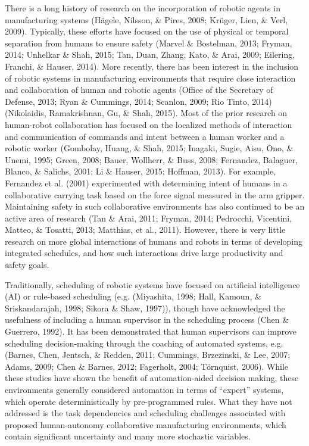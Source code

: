 There is a long history of research on the incorporation of robotic agents in manufacturing systems (Hägele, Nilsson, \& Pires, 2008; Krüger, Lien, \& Verl, 2009). Typically, these efforts have focused on the use of physical or temporal separation from humans to ensure safety (Marvel \& Bostelman, 2013; Fryman, 2014; Unhelkar \& Shah, 2015; Tan, Duan, Zhang, Kato, \& Arai, 2009; Eilering, Franchi, \& Hauser, 2014). More recently, there has been interest in the inclusion of robotic systems in manufacturing environments that require close interaction and collaboration of human and robotic agents (Office of the Secretary of Defense, 2013; Ryan \& Cummings, 2014; Scanlon, 2009; Rio Tinto, 2014) (Nikolaidis, Ramakrishnan, Gu, \& Shah, 2015). Most of the prior research on human-robot collaboration has focused on the localized methods of interaction and communication of commands and intent between a human worker and a robotic worker (Gombolay, Huang, \& Shah, 2015; Inagaki, Sugie, Aisu, Ono, \& Unemi, 1995; Green, 2008; Bauer, Wollherr, \& Buss, 2008; Fernandez, Balaguer, Blanco, \& Salichs, 2001; Li \& Hauser, 2015; Hoffman, 2013). For example, Fernandez et al. (2001) experimented with determining intent of humans in a collaborative carrying task based on the force signal measured in the arm gripper. Maintaining safety in such collaborative environments has also continued to be an active area of research (Tan \& Arai, 2011; Fryman, 2014; Pedrocchi, Vicentini, Matteo, \& Tosatti, 2013; Matthias, et al., 2011). However, there is very little research on more global interactions of humans and robots in terms of developing integrated schedules, and how such interactions drive large productivity and safety goals.

Traditionally, scheduling of robotic systems have focused on artificial intelligence (AI) or rule-based scheduling (e.g. (Miyashita, 1998; Hall, Kamoun, \& Sriskandarajah, 1998; Sikora \& Shaw, 1997)), though have acknowledged the usefulness of including a human supervisor in the scheduling process (Chen \& Guerrero, 1992). It has been demonstrated that human supervisors can improve scheduling decision-making through the coaching of automated systems, e.g. (Barnes, Chen, Jentsch, \& Redden, 2011; Cummings, Brzezinski, \& Lee, 2007; Adams, 2009; Chen \& Barnes, 2012; Fagerholt, 2004; Törnquist, 2006). While these studies have shown the benefit of automation-aided decision making, these environments generally considered automation in terms of “expert” systems, which operate deterministically by pre-programmed rules. What they have not addressed is the task dependencies and scheduling challenges associated with proposed human-autonomy collaborative manufacturing environments, which contain significant uncertainty and many more stochastic variables.

